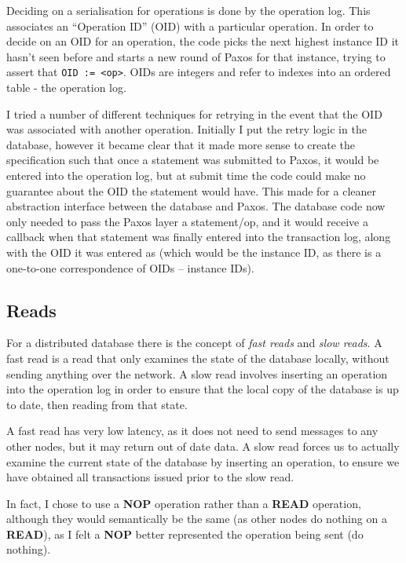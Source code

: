 \documentclass[12pt,twoside,notitlepage]{report}
\newcommand{\op}[1]  {{\bf #1}}         %
\begin{document}
Deciding on a serialisation for operations is done by the operation log. This associates an
``Operation ID'' (OID) with a particular operation. In order to decide on an OID for an operation,
the code picks the next highest instance ID it hasn't seen before and starts a new round of Paxos
for that instance, trying to assert that \verb$OID := <op>$. OIDs are integers and refer to
indexes into an ordered table - the operation log.

I tried a number of different techniques for retrying in the event that the OID was associated
with another operation. Initially I put the retry logic in the database, however it became clear
that it made more sense to create the specification such that once a statement was submitted to
Paxos, it would be entered into the operation log, but at submit time the code could make no
guarantee about the OID the statement would have. This made for a cleaner abstraction interface
between the database and Paxos. The database code now only needed to pass the Paxos layer a
statement/op, and it would receive a callback when that statement was finally entered into the
transaction log, along with the OID it was entered as (which would be the instance ID, as there is
a one-to-one correspondence of OIDs -- instance IDs).

\subsection{Reads}

For a distributed database there is the concept of \emph{fast reads} and \emph{slow reads}. A fast
read is a read that only examines the state of the database locally, without sending anything over
the network.  A slow read involves inserting an operation into the operation log in order to
ensure that the local copy of the database is up to date, then reading from that state.

A fast read has very low latency, as it does not need to send messages to any other nodes, but it
may return out of date data. A slow read forces us to actually examine the current state of the
database by inserting an operation, to ensure we have obtained all transactions issued
prior to the slow read.

In fact, I chose to use a \op{NOP} operation rather than a \op{READ} operation, although they
would semantically be the same (as other nodes do nothing on a \op{READ}), as I felt a \op{NOP}
better represented the operation being sent (do nothing).
\end{document}

